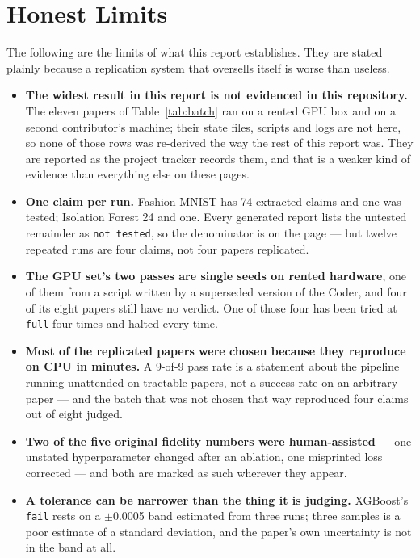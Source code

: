 \documentclass[10pt,twocolumn]{article}
\begin{document}
\section{Honest Limits}
\label{sec:limits}

The following are the limits of what this report establishes. They are stated plainly because a
replication system that oversells itself is worse than useless.

\begin{itemize}
  \item \textbf{The widest result in this report is not evidenced in this repository.} The eleven
    papers of Table~\ref{tab:batch} ran on a rented GPU box and on a second contributor's machine;
    their state files, scripts and logs are not here, so none of those rows was re-derived the way
    the rest of this report was. They are reported as the project tracker records them, and that
    is a weaker kind of evidence than everything else on these pages.
  \item \textbf{One claim per run.} Fashion-MNIST has 74 extracted claims and one was tested;
    Isolation Forest 24 and one. Every generated report lists the untested remainder as
    \texttt{not tested}, so the denominator is on the page --- but twelve repeated runs are four
    claims, not four papers replicated.
  \item \textbf{The GPU set's two passes are single seeds on rented hardware}, one of them from a
    script written by a superseded version of the Coder, and four of its eight papers still have
    no verdict. One of those four has been tried at \texttt{full} four times and halted every
    time.
  \item \textbf{Most of the replicated papers were chosen because they reproduce on CPU in
    minutes.} A 9-of-9 pass rate is a statement about the pipeline running unattended on tractable
    papers, not a success rate on an arbitrary paper --- and the batch that was not chosen that way
    reproduced four claims out of eight judged.
  \item \textbf{Two of the five original fidelity numbers were human-assisted} --- one unstated
    hyperparameter changed after an ablation, one misprinted loss corrected --- and both are
    marked as such wherever they appear.
  \item \textbf{A tolerance can be narrower than the thing it is judging.} XGBoost's
    \texttt{fail} rests on a $\pm$0.0005 band estimated from three runs; three samples is a poor
    estimate of a standard deviation, and the paper's own uncertainty is not in the band at all.

\end{itemize}
\end{document}
